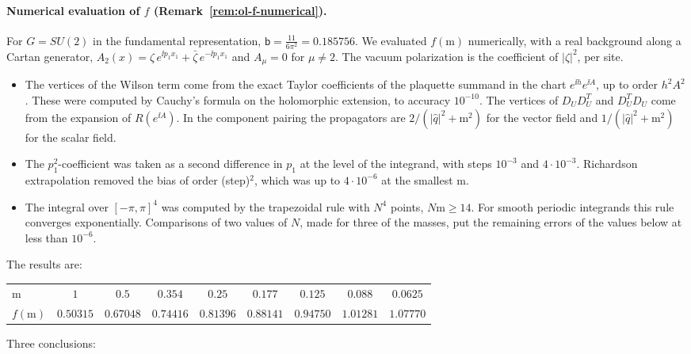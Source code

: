 \paragraph{Numerical evaluation of $f$ (Remark~\ref{rem:ol-f-numerical}).}
For $G=SU(2)$ in the fundamental representation, $\mathsf b=\frac{11}{6\pi^2}=0.185756$. We evaluated $f(\mathrm m)$ numerically, with a real background along a Cartan generator, $A_2(x)=\zeta\,e^{\ii p_1x_1}+\bar\zeta\,e^{-\ii p_1x_1}$ and $A_\mu=0$ for $\mu\ne2$. The vacuum polarization is the coefficient of $|\zeta|^2$, per site.
\begin{itemize}
\item The vertices of the Wilson term come from the exact Taylor coefficients of the plaquette summand in the chart $e^{\ii h}e^{\ii A}$, up to order $h^2A^2$. These were computed by Cauchy's formula on the holomorphic extension, to accuracy $10^{-10}$. The vertices of $D_UD_U^T$ and $D_U^TD_U$ come from the expansion of $R(e^{\ii A})$. In the component pairing the propagators are $2/(|\hat q|^2+\mathrm m^2)$ for the vector field and $1/(|\hat q|^2+\mathrm m^2)$ for the scalar field.
\item The $p_1^2$-coefficient was taken as a second difference in $p_1$ at the level of the integrand, with steps $10^{-3}$ and $4\cdot10^{-3}$. Richardson extrapolation removed the bias of order (step)$^2$, which was up to $4\cdot10^{-6}$ at the smallest $\mathrm m$.
\item The integral over $[-\pi,\pi]^4$ was computed by the trapezoidal rule with $N^4$ points, $N\mathrm m\ge14$. For smooth periodic integrands this rule converges exponentially. Comparisons of two values of $N$, made for three of the masses, put the remaining errors of the values below at less than $10^{-6}$.
\end{itemize}
The results are:
\begin{center}\small
\begin{tabular}{@{}lcccccccc@{}}
\hline
$\mathrm m$ & $1$ & $0.5$ & $0.354$ & $0.25$ & $0.177$ & $0.125$ & $0.088$ & $0.0625$ \\
$f(\mathrm m)$ & $0.50315$ & $0.67048$ & $0.74416$ & $0.81396$ & $0.88141$ & $0.94750$ & $1.01281$ & $1.07770$ \\
\hline
\end{tabular}
\end{center}
Three conclusions:
